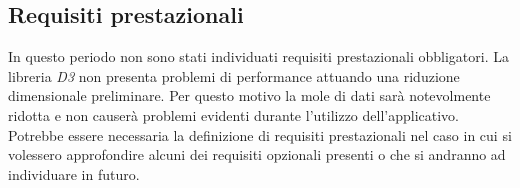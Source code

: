 \subsection{Requisiti prestazionali}

In questo periodo non sono stati individuati requisiti prestazionali obbligatori. La libreria \textit{D3} non presenta problemi di performance attuando una riduzione dimensionale preliminare. Per questo motivo la mole di dati sarà notevolmente ridotta e non causerà problemi evidenti durante l'utilizzo dell'applicativo.\\
Potrebbe essere necessaria la definizione di requisiti prestazionali nel caso in cui si volessero
approfondire alcuni dei requisiti opzionali presenti o che si andranno ad individuare in futuro. 